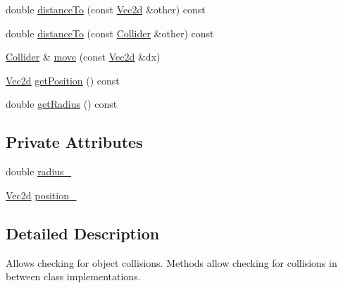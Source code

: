 \begin{DoxyCompactItemize}
\item 
double \hyperlink{class_collider_ad8d7202a4cab50704bdb17012dea8ffa}{distance\-To} (const \hyperlink{class_vec2d}{Vec2d} \&other) const 
\item 
double \hyperlink{class_collider_a69c933446d5804c6668e874239aae77f}{distance\-To} (const \hyperlink{class_collider}{Collider} \&other) const 
\item 
\hyperlink{class_collider}{Collider} \& \hyperlink{class_collider_a6f7e2accc954f5852f83ff487f156aff}{move} (const \hyperlink{class_vec2d}{Vec2d} \&dx)
\item 
\hyperlink{class_vec2d}{Vec2d} \hyperlink{class_collider_a1893928580356ec0c1ca7cbbbd2e4ab3}{get\-Position} () const 
\item 
double \hyperlink{class_collider_a89b739bb04aea802f0cd2f36d3367711}{get\-Radius} () const 
\end{DoxyCompactItemize}
\subsection*{Private Attributes}
\begin{DoxyCompactItemize}
\item 
double \hyperlink{class_collider_a762d208b956ffa20644243c8eb8ebefa}{radius\-\_\-}
\item 
\hyperlink{class_vec2d}{Vec2d} \hyperlink{class_collider_a6e88f831b1ca9fb7a99637be1ac1570f}{position\-\_\-}
\end{DoxyCompactItemize}


\subsection{Detailed Description}
Allows checking for object collisions. Methods allow checking for collisions in between class implementations. 

